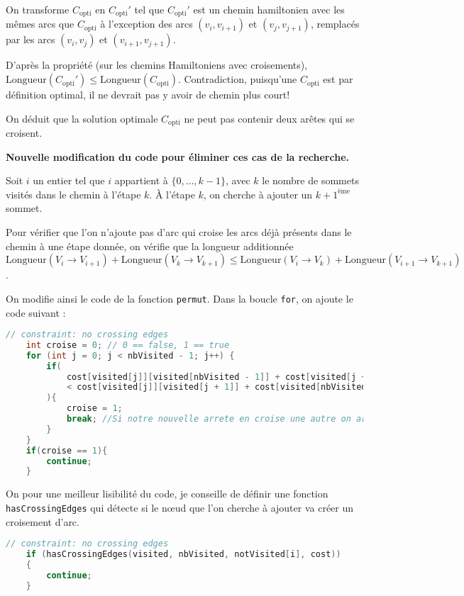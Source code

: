 On transforme $C_{\text{opti}}$ en $C_{\text{opti}}'$ tel que $C_{\text{opti}}'$ est un chemin hamiltonien avec les mêmes arcs que $C_{\text{opti}}$ à l'exception des arcs $(v_i, v_{i+1})$ et $(v_j , v_{j+1})$, remplacés par les arcs $(v_i, v_j)$ et $(v_{i+1}, v_{j+1})$.

D'après la propriété (sur les chemins Hamiltoniens avec croisements), $\text{Longueur}(C_{\text{opti}}') \leq \text{Longueur}(C_{\text{opti}})$. Contradiction, puisqu'une $C_{\text{opti}}$ est par définition optimal, il ne devrait pas y avoir de chemin plus court!

On déduit que la solution optimale $C_{\text{opti}}$ ne peut pas contenir deux arêtes qui se croisent.

\textbf{Nouvelle modification du code pour éliminer ces cas de la recherche.}

Soit $i$ un entier tel que $i$ appartient à $\{0, \ldots, k - 1\}$, avec $k$ le nombre de sommets visités dans le chemin à l'étape $k$. À l'étape $k$, on cherche à ajouter un $k+1^{\text{ème}}$ sommet.

Pour vérifier que l'on n'ajoute pas d'arc qui croise les arcs déjà présents dans le chemin à une étape donnée, on vérifie que la longueur additionnée $\text{Longueur}(V_i \rightarrow V_{i+1}) + \text{Longueur}(V_k \rightarrow V_{k+1}) \leq \text{Longueur}(V_i \rightarrow V_k) + \text{Longueur}(V_{i+1} \rightarrow V_{k+1})$.

On modifie ainsi le code de la fonction \texttt{permut}. Dans la boucle \texttt{for}, on ajoute le code suivant :

\begin{lstlisting}[language=C, caption={Contrainte : pas d'arcs croisés.}]
    // constraint: no crossing edges
    int croise = 0; // 0 == false, 1 == true
    for (int j = 0; j < nbVisited - 1; j++) {
        if(
            cost[visited[j]][visited[nbVisited - 1]] + cost[visited[j + 1]][notVisited[i]] 
            < cost[visited[j]][visited[j + 1]] + cost[visited[nbVisited - 1]][notVisited[i]]
        ){
            croise = 1;
            break; //Si notre nouvelle arrete en croise une autre on arrete
        }
    }
    if(croise == 1){
        continue;
    }
\end{lstlisting}

On pour une meilleur lisibilité du code, je conseille de définir une fonction \texttt{hasCrossingEdges} qui détecte si le nœud que l'on cherche à ajouter va créer un croisement d'arc.

\begin{lstlisting}[language=C, caption={Remplacement par une fonction pour plus de lisibilité.}]
    // constraint: no crossing edges
    if (hasCrossingEdges(visited, nbVisited, notVisited[i], cost))
    {
        continue;
    }
\end{lstlisting}


